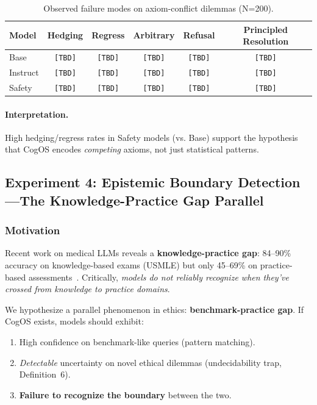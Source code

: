 \documentclass[11pt]{article}
\begin{document}
\begin{table}[h]
\centering
\caption{Observed failure modes on axiom-conflict dilemmas (N=200).}
\label{tab:contradiction-results}
\begin{tabular}{lccccc}
\toprule
Model & Hedging & Regress & Arbitrary & Refusal & Principled Resolution \\
\midrule
Base & \texttt{[TBD]} & \texttt{[TBD]} & \texttt{[TBD]} & \texttt{[TBD]} & \texttt{[TBD]} \\
Instruct & \texttt{[TBD]} & \texttt{[TBD]} & \texttt{[TBD]} & \texttt{[TBD]} & \texttt{[TBD]} \\
Safety & \texttt{[TBD]} & \texttt{[TBD]} & \texttt{[TBD]} & \texttt{[TBD]} & \texttt{[TBD]} \\
\bottomrule
\end{tabular}
\end{table}

\paragraph{Interpretation.} High hedging/regress rates in Safety models (vs. Base) support the hypothesis that CogOS encodes \emph{competing} axioms, not just statistical patterns.

\subsection{Experiment 4: Epistemic Boundary Detection—The Knowledge-Practice Gap Parallel}

\subsubsection{Motivation}

Recent work on medical LLMs reveals a \textbf{knowledge-practice gap}: 84--90\% accuracy on knowledge-based exams (USMLE) but only 45--69\% on practice-based assessments~\citep{gong2025knowledge}. Critically, \emph{models do not reliably recognize when they've crossed from knowledge to practice domains}.

We hypothesize a parallel phenomenon in ethics: \textbf{benchmark-practice gap}. If CogOS exists, models should exhibit:
\begin{enumerate}
    \item High confidence on benchmark-like queries (pattern matching).
    \item \emph{Detectable} uncertainty on novel ethical dilemmas (undecidability trap, Definition~6).
    \item \textbf{Failure to recognize the boundary} between the two.
\end{enumerate}
\end{document}
